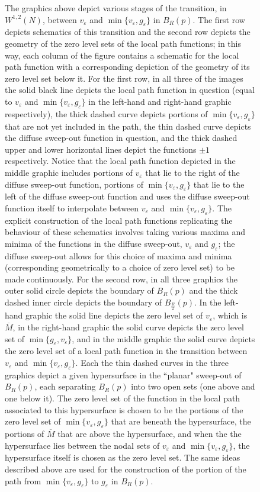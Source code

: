 \documentclass[11pt]{article}
\begin{document}
\begin{figure}[H]
    \caption{The graphics above depict various stages of the transition, in $W^{1,2}(N)$, between $v_\varepsilon$ and $\min\{v_\varepsilon,g_\varepsilon\}$ in $B_R(p)$. The first row depicts schematics of this transition and the second row depicts the geometry of the zero level sets of the local path functions; in this way, each column of the figure contains a schematic for the local path function with a corresponding depiction of the geometry of its zero level set below it. For the first row, in all three of the images the solid black line depicts the local path function in question (equal to $v_\varepsilon$ and $\min\{v_\varepsilon,g_\varepsilon\}$ in the left-hand and right-hand graphic respectively), the thick dashed curve depicts portions of $\min\{v_\varepsilon,g_\varepsilon\}$ that are not yet included in the path, the thin dashed curve depicts the diffuse sweep-out function in question, and the thick dashed upper and lower horizontal lines depict the functions $\pm 1$ respectively. Notice that the local path function depicted in the middle graphic includes portions of $v_\varepsilon$ that lie to the right of the diffuse sweep-out function, portions of $\min\{v_\varepsilon,g_\varepsilon\}$ that lie to the left of the diffuse sweep-out function and uses the diffuse sweep-out function itself to interpolate between $v_\varepsilon$ and $\min\{v_\varepsilon,g_\varepsilon\}$. The explicit construction of the local path functions replicating the behaviour of these schematics involves taking various maxima and minima of the functions in the diffuse sweep-out, $v_\varepsilon$ and $g_\varepsilon$; the diffuse sweep-out allows for this choice of maxima and minima (corresponding geometrically to a choice of zero level set) to be made continuously. For the second row, in all three graphics the outer solid circle depicts the boundary of $B_R(p)$ and the thick dashed inner circle depicts the boundary of $B_{\frac{R}{2}}(p)$. In the left-hand graphic the solid line depicts the zero level set of $v_\varepsilon$, which is $\overline{M}$, in the right-hand graphic the solid curve depicts the zero level set of $\min \{g_\varepsilon,v_\varepsilon\}$, and in the middle graphic the solid curve depicts the zero level set of a local path function in the transition between $v_\varepsilon$ and $\min\{v_\varepsilon,g_\varepsilon\}$. Each the thin dashed curves in the three graphics depict a given hypersurface in the “planar" sweep-out of $B_R(p)$, each separating $B_R(p)$ into two open sets (one above and one below it). The zero level set of the function in the local path associated to this hypersurface is chosen to be the portions of the zero level set of $\min\{v_\varepsilon,g_\varepsilon\}$ that are beneath the hypersurface, the portions of $\overline{M}$ that are above the hypersurface, and when the the hypersurface lies between the nodal sets of $v_\varepsilon$ and $\min\{v_\varepsilon,g_\varepsilon\}$, the hypersurface itself is chosen as the zero level set. The same ideas described above are used for the construction of the portion of the path from $\min\{v_\varepsilon,g_\varepsilon\}$ to $g_\varepsilon$ in $B_R(p)$.}
    \label{fig: local path}
\end{figure}
\end{document}
